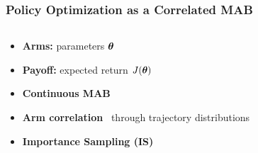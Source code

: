 \documentclass[aspectratio=169, table]{beamer}
\newcommand{\enb}[1]{\textcolor{poliblue1}{\textbf{#1}}}
\newcommand{\eno}[1]{\textcolor{orangep}{\textbf{#1}}}
\begin{document}
\begin{frame} 
\frametitle{Policy Optimization as a Correlated MAB } 
\begin{columns}
\begin{column}{.65\textwidth}
\begin{overlayarea}{\textwidth}{.75\textheight}
\begin{itemize}
	\setlength{\itemsep}{20pt}
	\item<1-> \enb{Arms:} parameters $\boldsymbol{\theta}$\vfill
	\item<2-> \enb{Payoff:} expected return $J(\boldsymbol{\theta})$\vfill
	\item<3-> \eno{Continuous MAB}~\citep{kleinberg2013bandits}\vfill
	\item<4-> {\enb{Arm correlation}~\citep{pandey2007multi} through trajectory distributions}\vfill
	\item<5-> \enb{Importance Sampling (IS)}
\end{itemize}
\end{overlayarea}
\end{column}
\begin{column}{.65\textwidth}
\begin{overlayarea}{\textwidth}{\textheight}
\end{overlayarea}
\end{column}
\end{columns}
\end{frame}
\end{document}
